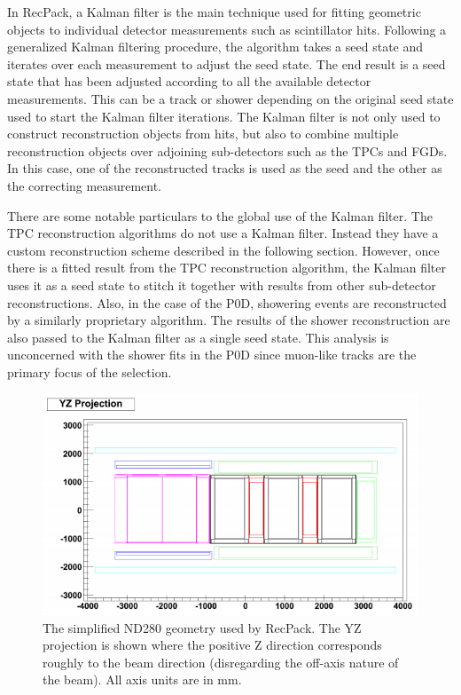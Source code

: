 In RecPack, a Kalman filter is the main technique used for fitting geometric objects to individual detector measurements such as scintillator hits. Following a generalized Kalman filtering procedure, the algorithm takes a seed state and iterates over each measurement to adjust the seed state. The end result is a seed state that has been adjusted according to all the available detector measurements. This can be a track or shower depending on the original seed state used to start the Kalman filter iterations. The Kalman filter is not only used to construct reconstruction objects from hits, but also to combine multiple reconstruction objects over adjoining sub-detectors such as the TPCs and FGDs. In this case, one of the reconstructed tracks is used as the seed and the other as the correcting measurement.

There are some notable particulars to the global use of the Kalman filter. The TPC reconstruction algorithms do not use a Kalman filter. Instead they have a custom reconstruction scheme described in the following section. However, once there is a fitted result from the TPC reconstruction algorithm, the Kalman filter uses it as a seed state to stitch it together with results from other sub-detector reconstructions. Also, in the case of the P0D, showering events are reconstructed by a similarly proprietary algorithm. The results of the shower reconstruction are also passed to the Kalman filter as a single seed state. This analysis is unconcerned with the shower fits in the P0D since muon-like tracks are the primary focus of the selection. 

\begin{figure}
\centering
\includegraphics[width=6.5in]{Figures/Reconstruction/nd280geom.PNG}
\caption{The simplified ND280 geometry used by RecPack. The YZ projection is shown where the positive Z direction corresponds roughly to the beam direction (disregarding the off-axis nature of the beam). All axis units are in mm.} 
\label{fig:nd280geom}
\end{figure}

